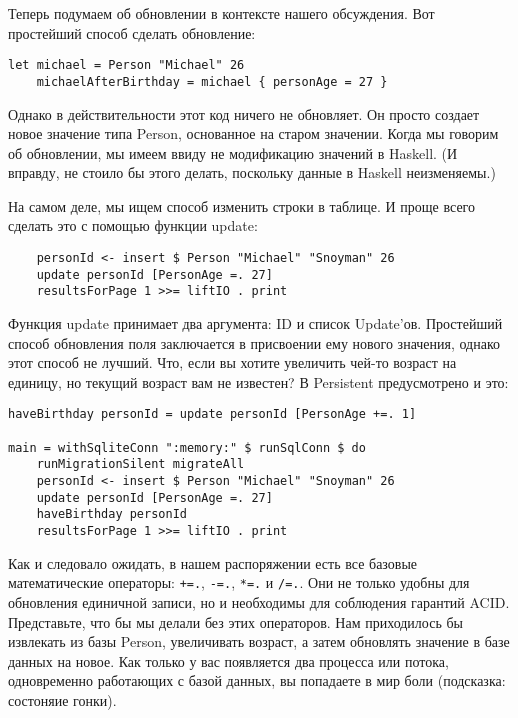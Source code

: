 Теперь подумаем об обновлении в контексте нашего обсуждения. Вот простейший способ сделать обновление:

\begin{lstlisting}
let michael = Person "Michael" 26
    michaelAfterBirthday = michael { personAge = 27 }
\end{lstlisting}

Однако в действительности этот код ничего не обновляет. Он просто создает новое значение типа Person, основанное на старом значении. Когда мы говорим об обновлении, мы имеем ввиду не модификацию значений в Haskell. (И вправду, не стоило бы этого делать, поскольку данные в Haskell неизменяемы.) %

На самом деле, мы ищем способ изменить строки в таблице. И проще всего сделать это с помощью функции update:

\begin{lstlisting}
    personId <- insert $ Person "Michael" "Snoyman" 26
    update personId [PersonAge =. 27]
    resultsForPage 1 >>= liftIO . print
\end{lstlisting}%

Функция update принимает два аргумента: ID и список Update'ов. Простейший способ обновления поля заключается в присвоении ему нового значения, однако этот способ не лучший. Что, если вы хотите увеличить чей-то возраст на единицу, но текущий возраст вам не известен? В Persistent предусмотрено и это:

\begin{lstlisting}
haveBirthday personId = update personId [PersonAge +=. 1]

main = withSqliteConn ":memory:" $ runSqlConn $ do
    runMigrationSilent migrateAll
    personId <- insert $ Person "Michael" "Snoyman" 26
    update personId [PersonAge =. 27]
    haveBirthday personId
    resultsForPage 1 >>= liftIO . print
\end{lstlisting}%

Как и следовало ожидать, в нашем распоряжении есть все базовые математические операторы: \lstinline'+=.', \lstinline'-=.', \lstinline'*=.' и \lstinline'/=.'. Они не только удобны для обновления единичной записи, но и необходимы для соблюдения гарантий ACID. Представьте, что бы мы делали без этих операторов. Нам приходилось бы извлекать из базы Person, увеличивать возраст, а затем обновлять значение в базе данных на новое. Как только у вас появляется два процесса или потока, одновременно работающих с базой данных, вы попадаете в мир боли (подсказка: состоняие гонки).

